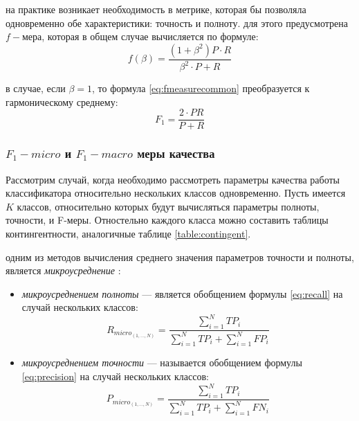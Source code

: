         на практике возникает необходимость в метрике, которая бы позволяла одновременно
    обе характеристики: точность и полноту. для этого предусмотрена $f-мера$, которая
    в общем случае вычисляется по формуле:
    \begin{equation}
        \label{eq:fmeasurecommon}
        f(\beta) = \dfrac{(1+\beta^2) P \cdot R}{\beta^2 \cdot P + R}
    \end{equation}

    в случае, если $\beta = 1$, то формула \ref{eq:fmeasurecommon} преобразуется
    к гармоническому среднему:
    \begin{equation}
        \label{eq:fmeasure}
        F_1 = \dfrac{2 \cdot P R}{P + R}
    \end{equation}

    \subsubsection{$F_1-micro$ и $F_1-macro$ меры качества}
    Рассмотрим случай, когда необходимо рассмотреть параметры качества работы
    классификатора относительно нескольких классов одновременно.
    Пусть имеется $K$ классов, относительно которых будут вычисляться параметры
    полноты, точности, и F-меры.
    Отностельно каждого класса можно составить таблицы контингентности,
    аналогичные таблице \ref{table:contingent}.

    одним из методов вычисления среднего значения параметров точности и полноты,
    является {\it микроусреднение} \cite{micromacromeasures}:
    \begin{itemize}
        \item {\it микроусреднением полноты} --- является обобщением формулы
            \ref{eq:recall} на случай нескольких классов:
            \begin{equation}
                R_{micro_{(1, \ldots, N)}} = \dfrac{\sum\limits_{i=1}^N TP_i}{\sum\limits_{i=1}^N TP_i + \sum\limits_{i=1}^N FP_i}
            \end{equation}
        \item {\it микроусреднением точности} --- называется обобщением формулы
            \ref{eq:precision} на случай нескольких классов:
            \begin{equation}
                P_{micro_{(1, \ldots, N)}} = \dfrac{\sum\limits_{i=1}^N TP_i}{\sum\limits_{i=1}^N TP_i + \sum\limits_{i=1}^N FN_i}
            \end{equation}
    \end{itemize}

